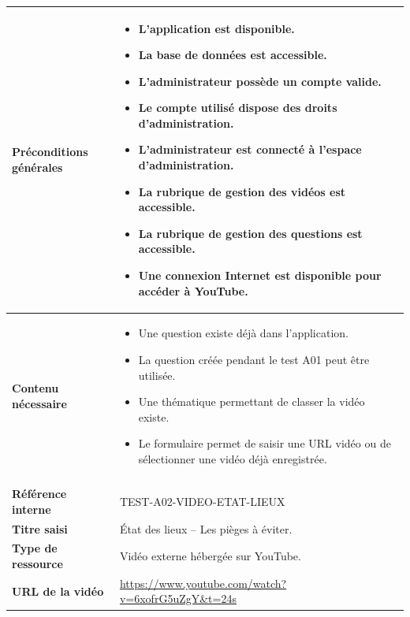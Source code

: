 \begin{longtable}{
    |>{\raggedright\arraybackslash}p{}
    |>{\raggedright\arraybackslash}p{}|
}
\textbf{Préconditions générales}
&
\begin{itemize}[leftmargin=*,nosep]
    \item L'application est disponible.
    \item La base de données est accessible.
    \item L'administrateur possède un compte valide.
    \item Le compte utilisé dispose des droits d'administration.
    \item L'administrateur est connecté à l'espace d'administration.
    \item La rubrique de gestion des vidéos est accessible.
    \item La rubrique de gestion des questions est accessible.
    \item Une connexion Internet est disponible pour accéder à YouTube.
\end{itemize}
\\
\hline

\textbf{Contenu nécessaire}
&
\begin{itemize}[leftmargin=*,nosep]
    \item Une question existe déjà dans l'application.
    \item La question créée pendant le test A01 peut être utilisée.
    \item Une thématique permettant de classer la vidéo existe.
    \item Le formulaire permet de saisir une URL vidéo ou de sélectionner
    une vidéo déjà enregistrée.
\end{itemize}
\\
\hline


\\
\hline

\textbf{Référence interne}
&
TEST-A02-VIDEO-ETAT-LIEUX
\\
\hline

\textbf{Titre saisi}
&
État des lieux -- Les pièges à éviter.
\\
\hline

\textbf{Type de ressource}
&
Vidéo externe hébergée sur YouTube.
\\
\hline

\textbf{URL de la vidéo}
&
\url{https://www.youtube.com/watch?v=6xofrG5uZgY&t=24s}
\\
\hline


\end{longtable}
